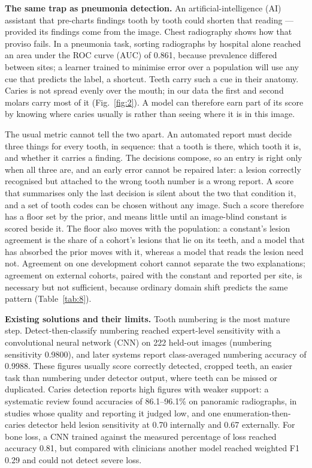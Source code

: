 \documentclass[conference]{IEEEtran}
\begin{document}
\textbf{The same trap as pneumonia detection.} An artificial-intelligence (AI) assistant that pre-charts findings tooth by tooth could shorten that reading — provided its findings come from the image. Chest radiography shows how that proviso fails. In a pneumonia task, sorting radiographs by hospital alone reached an area under the ROC curve (AUC) of 0.861, because prevalence differed between sites; a learner trained to minimise error over a population will use any cue that predicts the label, a shortcut. Teeth carry such a cue in their anatomy. Caries is not spread evenly over the mouth; in our data the first and second molars carry most of it (Fig.~\ref{fig:2}). A model can therefore earn part of its score by knowing where caries usually is rather than seeing where it is in this image.

The usual metric cannot tell the two apart. An automated report must decide three things for every tooth, in sequence: that a tooth is there, which tooth it is, and whether it carries a finding. The decisions compose, so an entry is right only when all three are, and an early error cannot be repaired later: a lesion correctly recognised but attached to the wrong tooth number is a wrong report. A score that summarises only the last decision is silent about the two that condition it, and a set of tooth codes can be chosen without any image. Such a score therefore has a floor set by the prior, and means little until an image-blind constant is scored beside it. The floor also moves with the population: a constant's lesion agreement is the share of a cohort's lesions that lie on its teeth, and a model that has absorbed the prior moves with it, whereas a model that reads the lesion need not. Agreement on one development cohort cannot separate the two explanations; agreement on external cohorts, paired with the constant and reported per site, is necessary but not sufficient, because ordinary domain shift predicts the same pattern (Table~\ref{tab:8}).

\textbf{Existing solutions and their limits.} Tooth numbering is the most mature step. Detect-then-classify numbering reached expert-level sensitivity with a convolutional neural network (CNN) on 222 held-out images (numbering sensitivity 0.9800), and later systems report class-averaged numbering accuracy of 0.9988. These figures usually score correctly detected, cropped teeth, an easier task than numbering under detector output, where teeth can be missed or duplicated. Caries detection reports high figures with weaker support: a systematic review found accuracies of 86.1–96.1\% on panoramic radiographs, in studies whose quality and reporting it judged low, and one enumeration-then-caries detector held lesion sensitivity at 0.70 internally and 0.67 externally. For bone loss, a CNN trained against the measured percentage of loss reached accuracy 0.81, but compared with clinicians another model reached weighted F1 0.29 and could not detect severe loss.
\end{document}
